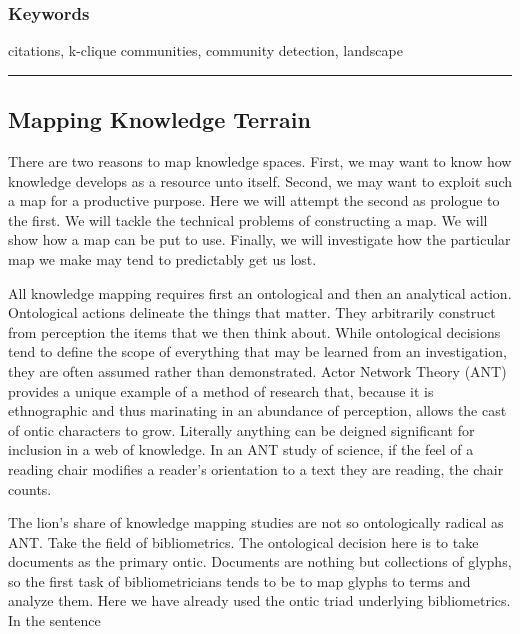 \documentclass[]{book}
\theoremstyle{definition}
\theoremstyle{definition}
\theoremstyle{definition}
\theoremstyle{remark}
\begin{document}
\hypertarget{keywords-4}{%
\subsubsection*{Keywords}\label{keywords-4}}


citations, k-clique communities, community detection,
landscape

\begin{center}\rule{0.5\linewidth}{\linethickness}\end{center}

\hypertarget{wok}{%
\subsection{Mapping Knowledge Terrain}\label{wok}}

There are two reasons to map knowledge spaces. First, we may want to
know how knowledge develops as a resource unto itself. Second, we may
want to exploit such a map for a productive purpose. Here we will
attempt the second as prologue to the first. We will tackle the
technical problems of constructing a map. We will show how a map can be
put to use. Finally, we will investigate how the particular map we make
may tend to predictably get us lost.

All knowledge mapping requires first an ontological and then an
analytical action. Ontological actions delineate the things that matter.
They arbitrarily construct from perception the items that we then think
about. While ontological decisions tend to define the scope of
everything that may be learned from an investigation, they are often
assumed rather than demonstrated. Actor Network Theory (ANT) provides a
unique example of a method of research that, because it is ethnographic
and thus marinating in an abundance of perception, allows the cast of
ontic characters to grow. Literally anything can be deigned significant
for inclusion in a web of knowledge. In an ANT study of science, if the
feel of a reading chair modifies a reader's orientation to a text they
are reading, the chair counts.

The lion's share of knowledge mapping studies are not so ontologically
radical as ANT. Take the field of bibliometrics. The ontological
decision here is to take documents as the primary ontic. Documents are
nothing but collections of glyphs, so the first task of bibliometricians
tends to be to map glyphs to terms and analyze them. Here we have
already used the ontic triad underlying bibliometrics. In the sentence
\end{document}
